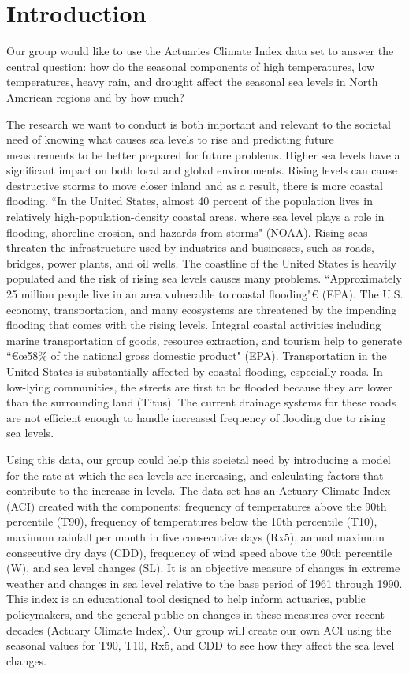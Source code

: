 \documentclass[12pt]{report}
\begin{document}
\newpage
 \section* {Introduction} 
		
\indent	\par Our group would like to use the Actuaries Climate Index data set to answer the central question: how do the seasonal components of high temperatures, low temperatures, heavy rain, and drought affect the seasonal sea levels in North American regions and by how much?
		\par The research we want to conduct is both important and relevant to the societal need of knowing what causes sea levels to rise and predicting future measurements to be better prepared for future problems. Higher sea levels have a significant impact on both local and global environments. Rising levels can cause destructive storms to move closer inland and as a result, there is more coastal flooding. \textquotedblleft In the United States, almost 40 percent of the population lives in relatively high-population-density coastal areas, where sea level plays a role in flooding, shoreline erosion, and hazards from storms" (NOAA). Rising seas threaten the infrastructure used by industries and businesses, such as roads, bridges, power plants, and oil wells. The coastline of the United States is heavily populated and the risk of rising sea levels causes many problems. \textquotedblleft Approximately 25 million people live in an area vulnerable to coastal flooding"€ (EPA). The U.S. economy, transportation, and many ecosystems are threatened by the impending flooding that comes with the rising levels. Integral coastal activities including marine transportation of goods, resource extraction, and tourism help to generate \textquotedblleft€œ58\% of the national gross domestic product" (EPA). Transportation in the United States is substantially affected by coastal flooding, especially roads. In low-lying communities, the streets are first to be flooded because they are lower than the surrounding land (Titus). The current drainage systems for these roads are not efficient enough to handle increased frequency of flooding due to rising sea levels. 
		\par Using this data, our group could help this societal need by introducing a model for the rate at which the sea levels are increasing, and calculating factors that contribute to the increase in levels. The data set has an Actuary Climate Index (ACI) created with the components: frequency of temperatures above the 90th percentile (T90), frequency of temperatures below the 10th percentile (T10), maximum rainfall per month in five consecutive days (Rx5), annual maximum consecutive dry days (CDD), frequency of wind speed above the 90th percentile (W), and sea level changes (SL). It is an objective measure of changes in extreme weather and changes in sea level relative to the base period of 1961 through 1990. This index is an educational tool designed to help inform actuaries, public policymakers, and the general public on changes in these measures over recent decades (Actuary Climate Index). Our group will create our own ACI using the seasonal values for T90, T10, Rx5, and CDD to see how they affect the sea level changes. 
	
\end{document}
